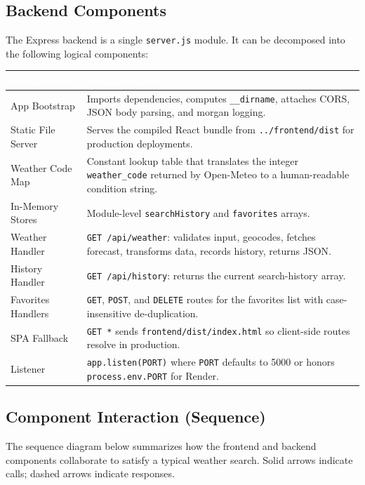 \documentclass[11pt,letterpaper]{article}
\newcommand{\thead}[1]{\textcolor{white}{\bfseries #1}}
\begin{document}
\subsection{Backend Components}
The Express backend is a single \texttt{server.js} module. It can be decomposed into the following logical components:

\begin{tabularx}{\linewidth}{| L{1.6in} | Y |}
\hline
{}\thead{Component} & \thead{Responsibility} \\
\hline
App Bootstrap         & Imports dependencies, computes \texttt{\_\_dirname}, attaches CORS, JSON body parsing, and morgan logging. \\ \hline
{}Static File Server    & Serves the compiled React bundle from \texttt{../frontend/dist} for production deployments. \\ \hline
Weather Code Map      & Constant lookup table that translates the integer \texttt{weather\_code} returned by Open-Meteo to a human-readable condition string. \\ \hline
{}In-Memory Stores      & Module-level \texttt{searchHistory} and \texttt{favorites} arrays. \\ \hline
Weather Handler       & \texttt{GET /api/weather}: validates input, geocodes, fetches forecast, transforms data, records history, returns JSON. \\ \hline
{}History Handler       & \texttt{GET /api/history}: returns the current search-history array. \\ \hline
Favorites Handlers    & \texttt{GET}, \texttt{POST}, and \texttt{DELETE} routes for the favorites list with case-insensitive de-duplication. \\ \hline
{}SPA Fallback          & \texttt{GET *} sends \texttt{frontend/dist/index.html} so client-side routes resolve in production. \\ \hline
Listener              & \texttt{app.listen(PORT)} where \texttt{PORT} defaults to 5000 or honors \texttt{process.env.PORT} for Render. \\ \hline
\end{tabularx}

\subsection{Component Interaction (Sequence)}
The sequence diagram below summarizes how the frontend and backend components collaborate to satisfy a typical weather search. Solid arrows indicate calls; dashed arrows indicate responses.
\end{document}
